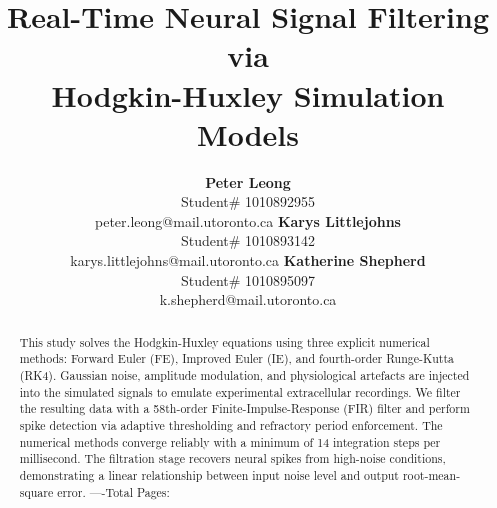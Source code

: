 \documentclass{article} %
\title{Real-Time Neural Signal Filtering via \\
Hodgkin-Huxley Simulation Models}
\author{\textbf{Peter Leong} \\
    Student\# 1010892955 \\
    peter.leong@mail.utoronto.ca
\And
    \textbf{Karys Littlejohns} \\
    Student\# 1010893142 \\
    karys.littlejohns@mail.utoronto.ca
\And
    \textbf{Katherine Shepherd} \\
    Student\# 1010895097 \\
    k.shepherd@mail.utoronto.ca
}
\begin{document}
\maketitle

\vspace{2ex}   %


\begin{abstract}

    This study solves the Hodgkin-Huxley equations using three explicit numerical methods: Forward Euler (FE), Improved Euler (IE), and fourth-order Runge-Kutta (RK4).
    Gaussian noise, amplitude modulation, and physiological artefacts are injected into the simulated signals to emulate experimental extracellular recordings.
    We filter the resulting data with a 58th-order Finite-Impulse-Response (FIR) filter and perform spike detection via adaptive thresholding and refractory period enforcement.
    The numerical methods converge reliably with a minimum of 14 integration steps per millisecond.
    The filtration stage recovers neural spikes from high-noise conditions, demonstrating a linear relationship between input noise level and output root-mean-square error.
    ----Total Pages: \pageref{last_page}
\end{abstract}

\vspace{2ex}
\end{document}
